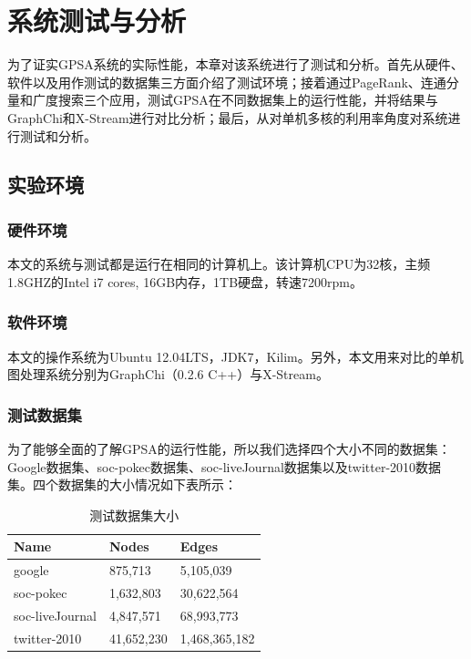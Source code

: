 
\chapter{系统测试与分析}

为了证实GPSA系统的实际性能，本章对该系统进行了测试和分析。首先从硬件、软件以及用作测试的数据集三方面介绍了测试环境；接着通过PageRank、连通分量和广度搜索三个应用，测试GPSA在不同数据集上的运行性能，并将结果与GraphChi和X-Stream进行对比分析；最后，从对单机多核的利用率角度对系统进行测试和分析。


\section{实验环境}

\subsection{硬件环境}
本文的系统与测试都是运行在相同的计算机上。该计算机CPU为32核，主频1.8GHZ的Intel i7 cores, 16GB内存，1TB硬盘，转速7200rpm。
\subsection{软件环境}
本文的操作系统为Ubuntu 12.04LTS，JDK7，Kilim。另外，本文用来对比的单机图处理系统分别为GraphChi（0.2.6 C++）与X-Stream。

\subsection{测试数据集}
为了能够全面的了解GPSA的运行性能，所以我们选择四个大小不同的数据集：Google数据集、soc-pokec数据集、soc-liveJournal数据集以及twitter-2010数据集。四个数据集的大小情况如下表所示：
\renewcommand\arraystretch{1.5}%
\begin{table}[!h]
\caption{测试数据集大小}\label{tab:bench}
\vspace{0.5em}
\centering
\begin{tabular}{l*{1}{C{2cm}}*{1}{L{6.2cm}}}
\toprule
Name         & Nodes & Edges\\
\midrule
google      & 875,713  & 5,105,039\\
soc-pokec      & 1,632,803 & 30,622,564\\
soc-liveJournal      & 4,847,571 & 68,993,773\\
twitter-2010      & 41,652,230 & 1,468,365,182\\

\bottomrule
\end{tabular}
\vspace{\baselineskip}
\end{table}
\renewcommand\arraystretch{1}


